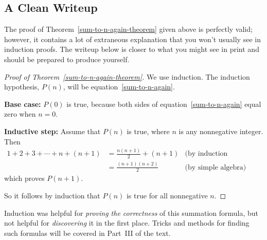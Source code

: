 \subsection{A Clean Writeup}

The proof of Theorem~\ref{sum-to-n-again-theorem} given above is perfectly
valid; however, it contains a lot of extraneous explanation that you won't
usually see in induction proofs.  The writeup below is closer to what you
might see in print and should be prepared to produce yourself.

\begin{proof}[Proof of Theorem~\ref{sum-to-n-again-theorem}]
We use induction.  The induction hypothesis, $P(n)$, will be
equation~\eqref{sum-to-n-again}.

\textbf{Base case:} $P(0)$ is true, because both sides of
equation~\eqref{sum-to-n-again} equal zero when $n=0$.

\textbf{Inductive step:} Assume that $P(n)$ is true, where
$n$ is any nonnegative integer.  Then
\begin{align*}
1 + 2 + 3 + \cdots + n + (n+1)
    & = \frac{n(n+1)}{2} + (n+1) & \text{(by induction hypothesis)}\\
    & = \frac{(n+1)(n+2)}{2}  & \text{(by simple algebra)}
\end{align*}
which proves $P(n+1)$.

So it follows by induction that $P(n)$ is true for all nonnegative $n$.
\end{proof}

Induction was helpful for \emph{proving the correctness} of this
summation formula, but not helpful for \emph{discovering} it in the
first place.   Tricks and methods for finding such formulas will be
covered in Part~III of the text.

